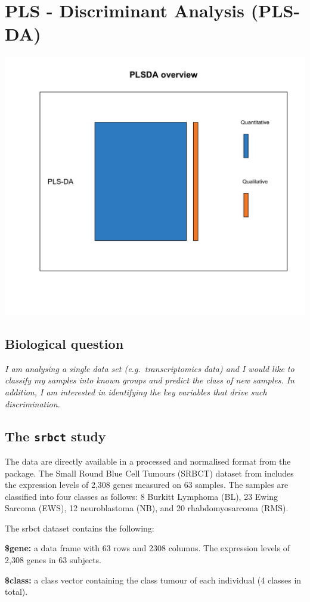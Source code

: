 \documentclass[]{book}
\theoremstyle{definition}
\theoremstyle{definition}
\theoremstyle{definition}
\theoremstyle{remark}
\begin{document}
\chapter{PLS - Discriminant Analysis (PLS-DA)}\label{plsda}

\begin{center}\includegraphics[width=0.5\linewidth]{Figures/overview-PLSDA-1} \end{center}

\section{Biological question}\label{biological-question-2}

{ \emph{I am analysing a single data set (e.g.~transcriptomics data) and
I would like to classify my samples into known groups and predict the
class of new samples. In addition, I am interested in identifying the
key variables that drive such discrimination.} }

\section{\texorpdfstring{The \texttt{srbct}
study}{The srbct study}}\label{the-srbct-study}

The data are directly available in a processed and normalised format
from the package. The Small Round Blue Cell Tumours (SRBCT) dataset from
\citep{Kha01} includes the expression levels of 2,308 genes measured on
63 samples. The samples are classified into four classes as follows: 8
Burkitt Lymphoma (BL), 23 Ewing Sarcoma (EWS), 12 neuroblastoma (NB),
and 20 rhabdomyosarcoma (RMS).

The srbct dataset contains the following:

\textbf{\$gene:} a data frame with 63 rows and 2308 columns. The
expression levels of 2,308 genes in 63 subjects.

\textbf{\$class:} a class vector containing the class tumour of each
individual (4 classes in total).
\end{document}
